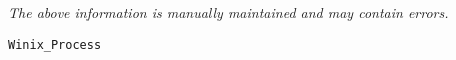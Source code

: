 \label{pkg:winix\_process}

{\tiny \it The above information is manually maintained and may contain errors.}
\begin{verbatim}
Winix_Process
\end{verbatim}
